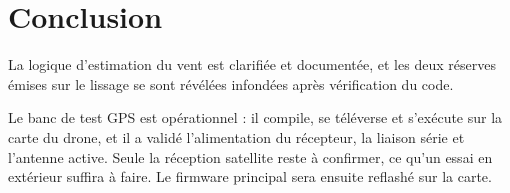 \documentclass[11pt,a4paper]{article}
\begin{document}
\section{Conclusion}

La logique d'estimation du vent est clarifiée et documentée, et les deux
réserves émises sur le lissage se sont révélées infondées après vérification
du code.

Le banc de test GPS est opérationnel : il compile, se téléverse et s'exécute
sur la carte du drone, et il a validé l'alimentation du récepteur, la liaison
série et l'antenne active. Seule la réception satellite reste à confirmer, ce
qu'un essai en extérieur suffira à faire. Le firmware principal sera ensuite
reflashé sur la carte.
\end{document}
